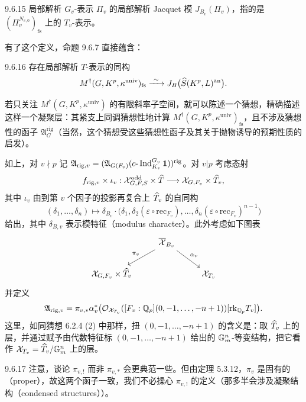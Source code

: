 \begin{defn}{9.6.15}\label{defn:a4-16-9-6-15}
局部解析 $G_v$-表示 $\Pi_v$ 的局部解析 Jacquet 模 $J_{B_v}(\Pi_v)$，指的是 $(\Pi_v^{N_{v,0}})_{\mathrm{fs}}$ 上的 $T_v$-表示。
\end{defn}

有了这个定义，命题 9.6.7 直接蕴含：

\begin{prop}{9.6.16}\label{prop:a4-16-9-6-16}
存在局部解析 $T$-表示的同构
\[
M^\dagger(G,K^p,\kappa^{\mathrm{univ}})_{\mathrm{fs}}\xrightarrow{\ \sim\ } J_B\bigl(\widehat S(K^p,L)^{\mathrm{an}}\bigr).
\]
\end{prop}

若只关注 $M^\dagger(G,K^p,\kappa^{\mathrm{univ}})$ 的有限斜率子空间，就可以陈述一个猜想，精确描述这样一个凝聚层：其紧支上同调猜想性地计算 $M^\dagger(G,K^p,\kappa^{\mathrm{univ}})_{\mathrm{fs}}$，且不涉及猜想性的函子 $\mathfrak A_G^{\mathrm{rig}}$（当然，这个猜想受这些猜想性函子及其关于抛物诱导的预期性质的启发）。

如上，对 $v\nmid p$ 记 $\mathfrak A_{\mathrm{rig},v}=(\mathfrak A_{G(F_v)}(c\text{-}\operatorname{Ind}_{K_v}^{G_v}\mathbf 1))^{\mathrm{rig}}$。对 $v|p$ 考虑态射
\[
f_{\mathrm{rig},v}\times\iota_v:\mathcal{X}^{\mathrm{odd}}_{G,F,S}\times\widehat T\longrightarrow\mathcal{X}_{G,F_v}\times\widehat T_v,
\]
其中 $\iota_v$ 由到第 $v$ 个因子的投影再复合上 $\widehat T_v$ 的自同构
\[
(\delta_1,\dots,\delta_n)\mapsto\delta_{B_v}\cdot\bigl(\delta_1,\delta_2(\varepsilon\circ\mathrm{rec}_{F_v}),\dots,\delta_n(\varepsilon\circ\mathrm{rec}_{F_v})^{n-1}\bigr)
\]
给出，其中 $\delta_{B,v}$ 表示模特征（modulus character）。此外考虑如下图表
\[
\begin{tikzcd}
& \overline{\XX}_{B_v}\arrow[dl,"\pi_v"']\arrow[dr,"\alpha_v"] & \\
\XX_{G,F_v}\times\wh T_v & & \XX_{T_v}
\end{tikzcd}
\]
并定义
\[
\mathfrak A_{\mathrm{rig},v}=\pi_{v,*}\alpha_v^*\bigl(\mathcal{O}_{\mathcal{X}_{T_v}}([F_v:\mathbb{Q}_p](0,-1,\dots,-n+1))[\mathrm{rk}_{\mathbb{Q}_p}T_v]\bigr).
\]
这里，如同猜想 6.2.4 (2) 中那样，扭 $(0,-1,\dots,-n+1)$ 的含义是：取 $\widehat T_v$ 上的层，并通过赋予由代数特征标 $(0,-1,\dots,-n+1)$ 给出的 $\mathbb{G}_m^n$-等变结构，把它看作 $\mathcal{X}_{T_v}=\widehat T_v/\mathbb{G}_m^n$ 上的层。

\begin{rem}{9.6.17}\label{rem:a4-16-9-6-17}
注意，谈论 $\pi_{v,!}$ 而非 $\pi_{v,*}$ 会更典范一些。但由定理 5.3.12，$\pi_v$ 是固有的（proper），故这两个函子一致，我们不必操心 $\pi_{v,!}$ 的定义（那多半会涉及凝聚结构（condensed structures））。
\end{rem}

